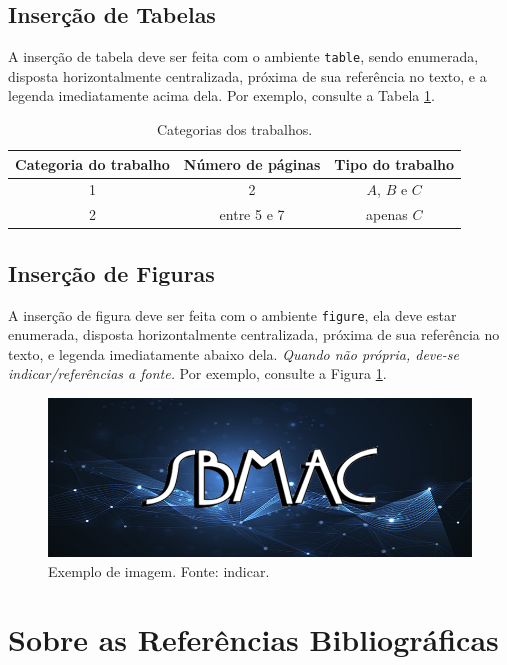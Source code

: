 \documentclass{pssbmac}
\begin{document}
\subsection{Inserção de Tabelas}

A inserção de tabela deve ser feita com o ambiente \verb!table!, sendo enumerada, disposta horizontalmente centralizada, próxima de sua referência no texto, e a legenda imediatamente acima dela. Por exemplo, consulte a Tabela \ref{tabela01}.

\begin{table}[H]
\caption{ {\small Categorias dos trabalhos.}}
\centering
\begin{tabular}{ccc}
\hline
Categoria do trabalho  & Número de páginas & Tipo do trabalho\\ \hline
1          & 2  & $A$, $B$ e $C$    \\
2          & entre 5 e 7  & apenas $C$ \\
\hline
\end{tabular}\label{tabela01}
\end{table}

\subsection{Inserção de Figuras}

A inserção de figura deve ser feita com o ambiente \verb!figure!, ela deve estar enumerada, disposta horizontalmente centralizada, próxima de sua referência no texto, e legenda imediatamente abaixo dela. \emph{Quando não própria, deve-se indicar/referências a fonte.} Por exemplo, consulte a Figura \ref{figura01}.

\begin{figure}[H]
\centering
\includegraphics[width=.7\textwidth]{ex_fig}
\caption{ {\small Exemplo de imagem. Fonte: indicar.}}
\label{figura01}
\end{figure}

\section{Sobre as Referências Bibliográficas}
\end{document}
